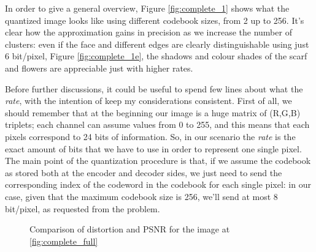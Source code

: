 \documentclass{article}
\begin{document}
In order to give a general overview, Figure \ref{fig:complete_1} shows what the quantized image looks like using different codebook sizes, from 2 up to 256. It's clear how the approximation gains in precision as we increase the number of clusters: even if the face and different edges are clearly distinguishable using just 6 bit/pixel, Figure \ref{fig:complete_1e}, the shadows and colour shades of the scarf and flowers are appreciable just with higher rates. 

Before further discussions, it could be useful to spend few lines about what the \textit{rate}, with the intention of keep my considerations consistent. First of all, we should remember that at the beginning our image is a huge matrix of (R,G,B) triplets; each channel can assume values from 0 to 255, and this means that each pixels correspond to 24 bits of information. So, in our scenario the \textit{rate} is the exact amount of bits that we have to use in order to represent one single pixel. The main point of the quantization procedure is that, if we assume the codebook as stored both at the encoder and decoder sides, we just need to send the corresponding index of the codeword in the codebook for each single pixel: in our case, given that the maximum codebook size is 256, we'll send at most 8 bit/pixel, as requested from the problem. 

\begin{figure}
	\centering
	\hfill
	\caption{Comparison of distortion and PSNR for the image at \ref{fig:complete_full}}
	\label{fig:dist_psnr_1}
\end{figure}
 
\end{document}
